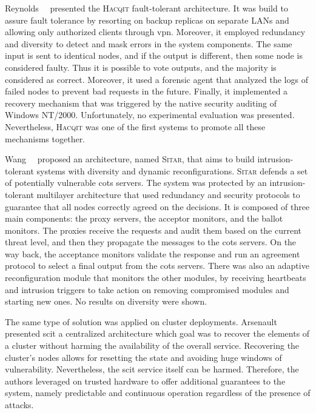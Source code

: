 Reynolds~\etal{}~\cite{Reynolds:2002} presented the \textsc{Hacqit} fault-tolerant architecture.
It was build to assure fault tolerance by resorting on backup replicas on separate LANs and allowing only authorized clients through \gls{vpn}.
Moreover, it employed redundancy and diversity to detect and mask errors in the system components.
The same input is sent to identical nodes, and if the output is different, then some node is considered faulty. 
Thus it is possible to vote outputs, and the majority is considered as correct.
Moreover, it used a forensic agent that analyzed the logs of failed nodes to prevent bad requests in the future.
Finally, it implemented a recovery mechanism that was triggered by the native security auditing of Windows NT/2000.
Unfortunately, no experimental evaluation was presented.
Nevertheless, \textsc{Hacqit} was one of the first systems to promote all these mechanisms together.


Wang~\etal{}~\cite{Wang:2003} proposed an architecture, named \textsc{Sitar}, that aims to build intrusion-tolerant systems with diversity and dynamic reconfigurations.
\textsc{Sitar} defends a set of potentially vulnerable \gls{cots} servers. 
The system was protected by an intrusion-tolerant multilayer architecture that used redundancy and security protocols to guarantee that all nodes correctly agreed on the decisions.
It is composed of three main components: the proxy servers, the acceptor monitors, and the ballot monitors.
The proxies receive the requests and audit them based on the current threat level, and then they propagate the messages to the \gls{cots} servers. 
On the way back, the acceptance monitors validate the response and run an agreement protocol to select a final output from the \gls{cots} servers.
There was also an adaptive reconfiguration module that monitors the other modules, by receiving heartbeats and intrusion triggers to take action on removing compromised modules and starting new ones.
No results on diversity were shown.


The same type of solution was applied on cluster deployments.
Arsenault~\etal{}~\cite{Arsenault:2007} presented \gls{scit} a centralized architecture which goal was to recover the elements of a cluster without harming the availability of the overall service.
Recovering the cluster's nodes allows for resetting the state and avoiding huge windows of vulnerability.
Nevertheless, the \gls{scit} service itself can be harmed. 
Therefore, the authors leveraged on trusted hardware to offer additional guarantees to the system, namely predictable and continuous operation regardless of the presence of attacks.


